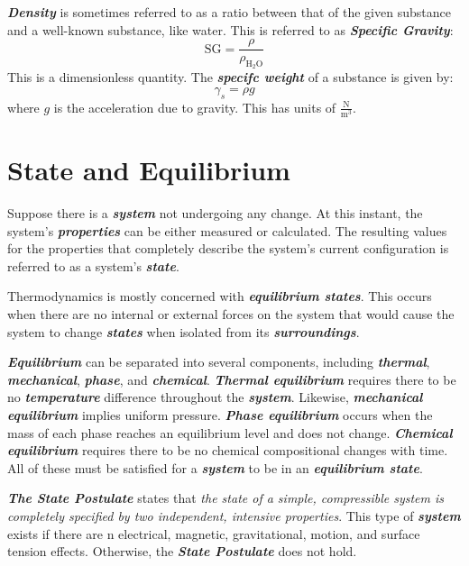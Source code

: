 \textbf{\textit{Density}} is sometimes referred to as a ratio between that of the given substance and a well-known substance, like water. This is referred to as \textbf{\textit{Specific Gravity}}:
%
\begin{equation}
\text{SG} = \frac{\rho}{\rho_{\text{H}_2 \text{O}}}
\end{equation}
%
This is a dimensionless quantity. The \textbf{\textit{specifc weight}} of a substance is given by:
%
\begin{equation}
\gamma_s = \rho g
\end{equation}
%
where $g$ is the acceleration due to gravity. This has units of $\frac{\text{N}}{\text{m}^3}$.

\section{State and Equilibrium}
Suppose there is a \textbf{\textit{system}} not undergoing any change. At this instant, the system's \textbf{\textit{properties}} can be either measured or calculated. The resulting values for the properties that completely describe the system's current configuration is referred to as a system's \textbf{\textit{state}}.

Thermodynamics is mostly concerned with \textbf{\textit{equilibrium states}}. This occurs when there are no internal or external forces on the system that would cause the system to change \textbf{\textit{states}} when isolated from its \textbf{\textit{surroundings}}.

\textbf{\textit{Equilibrium}} can be separated into several components, including \textbf{\textit{thermal}}, \textbf{\textit{mechanical}}, \textbf{\textit{phase}}, and \textbf{\textit{chemical}}. \textbf{\textit{Thermal equilibrium}} requires there to be no \textbf{\textit{temperature}} difference throughout the \textbf{\textit{system}}. Likewise, \textbf{\textit{mechanical equilibrium}} implies uniform pressure. \textbf{\textit{Phase equilibrium}} occurs when the mass of each phase reaches an equilibrium level and does not change. \textbf{\textit{Chemical equilibrium}} requires there to be no chemical compositional changes with time. All of these must be satisfied for a \textbf{\textit{system}} to be in an \textbf{\textit{equilibrium state}}.

\textbf{\textit{The State Postulate}} states that \textit{the state of a simple, compressible system is completely specified by two independent, intensive properties}. This type of \textbf{\textit{system}} exists if there are n electrical, magnetic, gravitational, motion, and surface tension effects. Otherwise, the \textbf{\textit{State Postulate}} does not hold.


